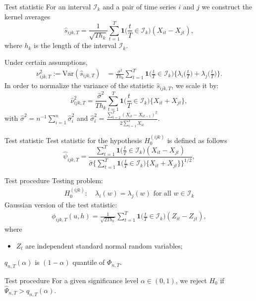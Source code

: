 \documentclass[10pt]{beamer}
\newcommand{\Var}{\mathrm{Var}}
\newcommand{\ind}{\boldsymbol{1}\Big( \frac{t}{T} \in \mathcal{I}_k \Big)} %
\begin{document}
\begin{frame}{Test statistic}
For an interval $\mathcal{I}_k$ and a pair of time series $i$ and $j$ we construct the kernel averages
\begin{equation*}
\hat{s}_{ijk,T} = \frac{1}{\sqrt{T h_k}} \sum\limits_{t=1}^T \ind (X_{it} -X_{jt}), 
\end{equation*}
where $h_k$ is the length of the interval $\mathcal{I}_k$. \pause 

Under certain assumptions, 
\begin{align*}
\nu_{ijk,T}^2 := \Var(\hat{s}_{ijk,T})  & = \frac{\sigma^2}{Th_k} \sum\limits_{t=1}^T \ind \Big\{ \lambda_i\Big(\frac{t}{T}\Big) + \lambda_j\Big(\frac{t}{T}\Big) \Big\}. 
\end{align*}\pause
In order to normalize the variance of the statistic $\hat{s}_{ijk,T}$, we scale it by:
\[ \hat{\nu}_{ijk,T}^2 = \frac{\hat{\sigma}^2}{Th_k} \sum\limits_{t=1}^T \ind \{ X_{it} + X_{jt} \}, \]
with $\hat{\sigma}^2 = n^{-1} \sum_{i = 1}^n \hat{\sigma}_i^2$ and $\hat{\sigma}_i^2 = \frac{\sum_{t=2}^T (X_{it}-X_{it-1})^2}{2 \sum_{t=1}^T X_{it}}$.\hyperlink{frame_sigma}{}
\end{frame}


\begin{frame}[label = frame_teststatistic]{Test statistic}
Test statistic for the hypothesis $H_0^{(ijk)}$ is defined as follows
\begin{equation*}
\widehat{\psi}_{ijk, T} = \frac{\sum\nolimits_{t=1}^T \ind (X_{it} -X_{jt})}{\hat{\sigma} \big\{ \sum\nolimits_{t=1}^T \ind \{ X_{it} + X_{jt} \}\big\}^{1/2}}, 
\end{equation*} 
\end{frame}


\begin{frame}{Test procedure}
Testing problem:
\vspace{-3mm}
\begin{align*}
H_0^{(ijk)}: \quad \lambda_i(w) = \lambda_j(w) \text{ for all } w \in \mathcal{I}_k
\end{align*} \pause
\vspace{-2mm}
Gaussian version of the test statistic:
\begin{align*}
\phi_{ijk,T}(u,h) = \frac{1}{\sqrt{2 T h_k}} \sum\limits_{t=1}^T \ind (Z_{it} - Z_{jt}), 
\end{align*}
where 
\begin{itemize}
	\item $Z_t$ are independent standard normal random variables;
\end{itemize}
$q_{n,T}(\alpha)$ is  $(1 - \alpha)$ quantile of $\Phi_{n,T}$.\pause
\begin{block}{Test procedure}
For a given significance level $\alpha \in (0,1)$, we reject $H_0$ if $\widehat{\Psi}_{n,T} > q_{n,T}(\alpha)$.
\end{block}
\end{frame}
\end{document}
